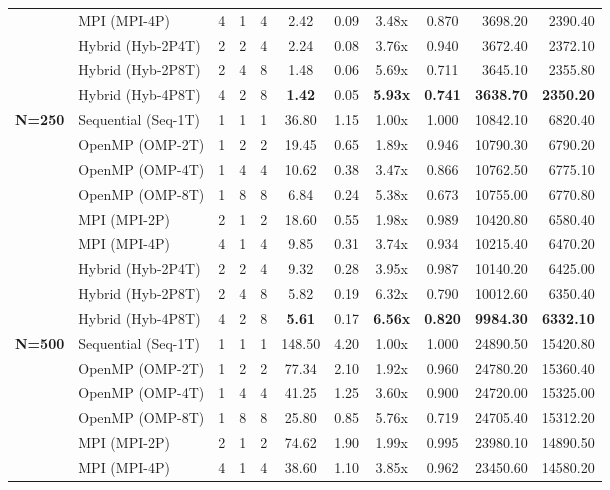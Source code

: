 \documentclass[conference]{IEEEtran}
\begin{document}
\begin{table}[t]
\begin{adjustbox}{width=\textwidth,center}
\begin{tabular}{llcccccccrr}
 & MPI (MPI-4P)         & 4 & 1 & 4 & 2.42 & 0.09 & 3.48x & 0.870 & 3698.20 & 2390.40 \\
 & Hybrid (Hyb-2P4T)    & 2 & 2 & 4 & 2.24 & 0.08 & 3.76x & 0.940 & 3672.40 & 2372.10 \\
 & Hybrid (Hyb-2P8T)    & 2 & 4 & 8 & 1.48 & 0.06 & 5.69x & 0.711 & 3645.10 & 2355.80 \\
 & Hybrid (Hyb-4P8T)    & 4 & 2 & 8 & \textbf{1.42} & 0.05 & \textbf{5.93x} & \textbf{0.741} & \textbf{3638.70} & \textbf{2350.20} \\
\midrule
\multirow{9}{*}{\textbf{N=250}} 
 & Sequential (Seq-1T)  & 1 & 1 & 1 & 36.80 & 1.15 & 1.00x & 1.000 & 10842.10 & 6820.40 \\
 & OpenMP (OMP-2T)      & 1 & 2 & 2 & 19.45 & 0.65 & 1.89x & 0.946 & 10790.30 & 6790.20 \\
 & OpenMP (OMP-4T)      & 1 & 4 & 4 & 10.62 & 0.38 & 3.47x & 0.866 & 10762.50 & 6775.10 \\
 & OpenMP (OMP-8T)      & 1 & 8 & 8 & 6.84 & 0.24 & 5.38x & 0.673 & 10755.00 & 6770.80 \\
 & MPI (MPI-2P)         & 2 & 1 & 2 & 18.60 & 0.55 & 1.98x & 0.989 & 10420.80 & 6580.40 \\
 & MPI (MPI-4P)         & 4 & 1 & 4 & 9.85 & 0.31 & 3.74x & 0.934 & 10215.40 & 6470.20 \\
 & Hybrid (Hyb-2P4T)    & 2 & 2 & 4 & 9.32 & 0.28 & 3.95x & 0.987 & 10140.20 & 6425.00 \\
 & Hybrid (Hyb-2P8T)    & 2 & 4 & 8 & 5.82 & 0.19 & 6.32x & 0.790 & 10012.60 & 6350.40 \\
 & Hybrid (Hyb-4P8T)    & 4 & 2 & 8 & \textbf{5.61} & 0.17 & \textbf{6.56x} & \textbf{0.820} & \textbf{9984.30} & \textbf{6332.10} \\
\midrule
\multirow{9}{*}{\textbf{N=500}} 
 & Sequential (Seq-1T)  & 1 & 1 & 1 & 148.50 & 4.20 & 1.00x & 1.000 & 24890.50 & 15420.80 \\
 & OpenMP (OMP-2T)      & 1 & 2 & 2 & 77.34 & 2.10 & 1.92x & 0.960 & 24780.20 & 15360.40 \\
 & OpenMP (OMP-4T)      & 1 & 4 & 4 & 41.25 & 1.25 & 3.60x & 0.900 & 24720.00 & 15325.00 \\
 & OpenMP (OMP-8T)      & 1 & 8 & 8 & 25.80 & 0.85 & 5.76x & 0.719 & 24705.40 & 15312.20 \\
 & MPI (MPI-2P)         & 2 & 1 & 2 & 74.62 & 1.90 & 1.99x & 0.995 & 23980.10 & 14890.50 \\
 & MPI (MPI-4P)         & 4 & 1 & 4 & 38.60 & 1.10 & 3.85x & 0.962 & 23450.60 & 14580.20 \\

\end{tabular}
\end{adjustbox}
\end{table}
\end{document}
